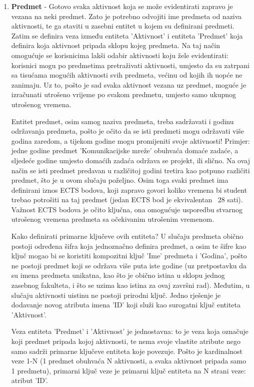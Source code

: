 \documentclass[times, utf8, zavrsni]{fer}
\begin{document}
\begin{enumerate}[leftmargin=*]
\item \textbf{Predmet} - 
Gotovo svaka aktivnost koja se može evidentirati zapravo je vezana na neki predmet. Zato je potrebno odvojiti ime predmeta od naziva aktivnosti, te ga staviti u zasebni entitet u kojem su definirani predmeti. Zatim se definira veza između entiteta 'Aktivnost' i entiteta 'Predmet' koja definira koja aktivnost pripada sklopu kojeg predmeta. Na taj način omogućuje se korisnicima lakši odabir aktivnosti koju žele evidentirati: korisnici mogu po predmetima pretraživati aktivnosti, umjesto da su zatrpani sa tisućama mogućih aktivnosti svih predmeta, većinu od kojih ih uopće ne zanimaju. Uz to, pošto je sad svaka aktivnost vezana uz predmet, moguće je izračunati utrošeno vrijeme po svakom predmetu, umjesto samo ukupnog utrošenog vremena.

Entitet predmet, osim samog naziva predmeta, treba sadržavati i godinu održavanja predmeta, pošto je očito da se isti predmeti mogu održavati više godina zaredom, a tijekom godine mogu promijeniti svoje aktivnosti! Primjer: jedne godine predmet 'Komunikacijske mreže' obuhvaća domaće zadaće, a sljedeće godine umjesto domaćih zadaća održava se projekt, ili slično. Na ovaj način se isti predmet predavan u različitoj godini tretira kao potpuno različiti predmet, što je u ovom slučaju poželjno. Osim toga svaki predmet ima definirani iznos ECTS bodova, koji zapravo govori koliko vremena bi student trebao potrošiti na taj predmet (jedan ECTS bod je ekvivalentan ~28 sati). Važnost ECTS bodova je očito ključna, ona omogućuje usporedbu stvarnog utrošenog vremena predmeta sa očekivanim utrošenim vremenom.

Kako definirati primarne ključeve ovih entiteta? U slučaju predmeta obično postoji određena šifra koja jednoznačno definira predmet, a osim te šifre kao ključ mogao bi se koristiti kompozitni ključ 'Ime' predmeta i 'Godina', pošto ne postoji predmet koji se održava više puta iste godine (uz pretpostavku da su imena predmeta unikatna, kao što je obično istina u sklopu jednog zasebnog fakulteta, i što se uzima kao istina za ovaj završni rad). Međutim, u slučaju aktivnosti uistinu ne postoji prirodni ključ. Jedno rješenje je dodavanje novog atributa imena 'ID' koji služi kao surogatni ključ entiteta 'Aktivnost'.

Veza entiteta 'Predmet' i 'Aktivnost' je jednostavna: to je veza koja označuje koji predmet pripada kojoj aktivnosti, te nema svoje vlastite atribute nego samo sadrži primarne ključeve entiteta koje povezuje. Pošto je kardinalnost veze 1-N (1 predmet obuhvaća N aktivnosti, a svaka aktivnost pripada samo 1 predmetu), primarni ključ veze je primarni ključ entiteta na N strani veze: atribut 'ID'.\clearpage


\end{enumerate}
\end{document}
